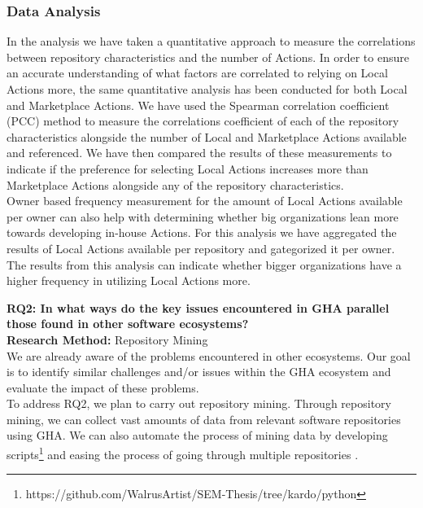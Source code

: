 \documentclass[conference]{IEEEtran}
\begin{document}
          \subsubsection{\textbf{Data Analysis}}
            In the analysis we have taken a quantitative approach to measure the correlations between repository characteristics and the number of Actions. In order to ensure an accurate understanding of what factors are correlated to relying on Local Actions more, the same quantitative analysis has been conducted for both Local and Marketplace Actions. We have used the Spearman correlation coefficient (PCC) method to measure the correlations coefficient of each of the repository characteristics alongside the number of Local and Marketplace Actions available and referenced. We have then compared the results of these measurements to indicate if the preference for selecting Local Actions increases more than Marketplace Actions alongside any of the repository characteristics. \\
            Owner based frequency measurement for the amount of Local Actions available per owner can also help with determining whether big organizations lean more towards developing in-house Actions. For this analysis we have aggregated the results of Local Actions available per repository and gategorized it per owner. The results from this analysis can indicate whether bigger organizations have a higher frequency in utilizing Local Actions more.

        \textbf{RQ2: In what ways do the key issues encountered in GHA parallel those found in other software ecosystems?}\\

            \textbf{Research Method:} Repository Mining\\
            We are already aware of the problems encountered in other ecosystems. Our goal is to identify similar challenges and/or issues within the GHA ecosystem and evaluate the impact of these problems.\\
            To address RQ2, we plan to carry out repository mining. Through repository mining, we can collect vast amounts of data from relevant software repositories using GHA. We can also automate the process of mining data by developing scripts\footnote{https://github.com/WalrusArtist/SEM-Thesis/tree/kardo/python}  and easing the process of going through multiple repositories \cite{chaturvedi2013tools}.\\
\end{document}
